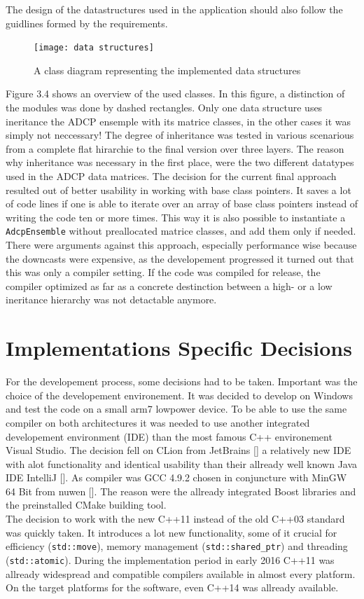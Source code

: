 The design of the datastructures used in the application should also follow the guidlines formed by the requirements. 
\begin{figure}[h]
\centering
      \texttt{[image: data structures]}
        \caption{A class diagram representing the implemented data structures}
\end{figure}
Figure 3.4 shows an overview of the used classes. In this figure, a distinction of the modules was done by dashed rectangles. Only one data structure uses ineritance the ADCP ensemple with its matrice classes, in the other cases it was simply not neccessary! The degree of inheritance was tested in various scenarious from a complete flat hirarchie to the final version over three layers. The reason why inheritance was necessary in the first place, were the two different datatypes used in the ADCP data matrices. The decision for the current final approach resulted out of better usability in working with base class pointers. It saves a lot of code lines if one is able to iterate over an array of base class pointers instead of writing the code ten or more times. This way it is also possible to instantiate a \texttt{AdcpEnsemble} without preallocated matrice classes, and add them only if needed. There were arguments against this approach, especially performance wise because the downcasts were expensive, as the developement progressed it turned out that this was only a compiler setting. If the code was compiled for release, the compiler optimized as far as a concrete destinction between a high- or a low ineritance hierarchy was not detactable anymore.

\section{Implementations Specific Decisions}
For the developement process, some decisions had to be taken. Important was the choice of the developement environement. It was decided to develop on Windows and test the code on a small arm7 lowpower device. To be able to use the same compiler on both architectures it was needed to use another integrated developement environment (IDE) than the most famous C++ environement Visual Studio. The decision fell on CLion from JetBrains [] a relatively new IDE with alot functionality and identical usability than their allready well known Java IDE IntelliJ []. As compiler was GCC 4.9.2 chosen in conjuncture with MinGW 64 Bit from nuwen []. The reason were the allready integrated Boost libraries and the preinstalled CMake building tool.\\
The decision to work with the new C++11 instead of the old C++03 standard was quickly taken. It introduces a lot new functionality, some of it crucial for efficiency (\texttt{std::move}), memory management (\texttt{std::shared\_ptr}) and threading (\texttt{std::atomic}). During the implementation period in early 2016 C++11 was allready widespread and compatible compilers available in almost every platform. On the target platforms for the software, even C++14 was allready available.

